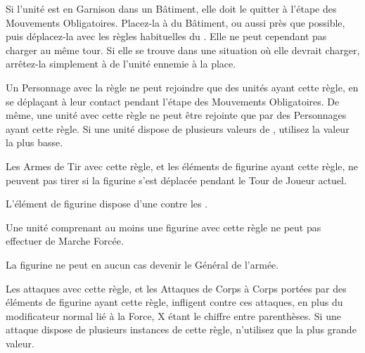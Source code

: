 Si l'unité est en Garnison dans un Bâtiment, elle doit le quitter à l'étape des Mouvements Obligatoires. Placez-la à  du Bâtiment, ou aussi près que possible, puis déplacez-la avec les règles habituelles du \randommovement{}. Elle ne peut cependant pas charger au même tour. Si elle se trouve dans une situation où elle devrait charger, arrêtez-la simplement à  de l'unité ennemie à la place.

Un Personnage avec la règle \randommovement{} ne peut rejoindre que des unités ayant cette règle, en se déplaçant à leur contact pendant l'étape des Mouvements Obligatoires. De même, une unité avec cette règle ne peut être rejointe que par des Personnages ayant cette règle. Si une unité dispose de plusieurs valeurs de \randommovement{}, utilisez la valeur la plus basse.


Les Armes de Tir avec cette règle, et les éléments de figurine ayant cette règle, ne peuvent pas tirer si la figurine s'est déplacée pendant le Tour de Joueur actuel.


L'élément de figurine dispose d'une  contre les \flamingattacks{}.


Une unité comprenant au moins une figurine avec cette règle ne peut pas effectuer de Marche Forcée.


La figurine ne peut en aucun cas devenir le Général de l'armée.


Les attaques avec cette règle, et les Attaques de Corps à Corps portées par des éléments de figurine ayant cette règle, infligent  contre ces attaques, en plus du modificateur normal lié à la Force, X étant le chiffre entre parenthèses. Si une attaque dispose de plusieurs instances de cette règle, n'utilisez que la plus grande valeur.


